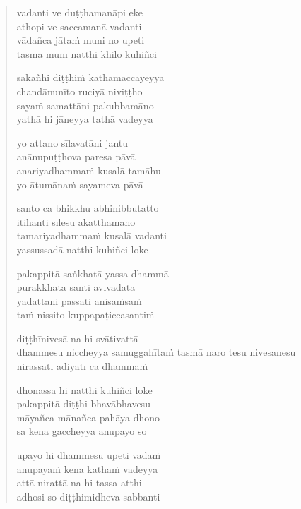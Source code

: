 

\cleartoverso

\vspace*{30mm}

\begin{verse}

vadanti ve duṭṭhamanāpi eke\\
athopi ve saccamanā vadanti\\
vādañca jātaṁ muni no upeti\\
tasmā munī natthi khilo kuhiñci

sakañhi diṭṭhiṁ kathamaccayeyya\\
chandānunīto ruciyā niviṭṭho\\
sayaṁ samattāni pakubbamāno\\
yathā hi jāneyya tathā vadeyya

yo attano sīlavatāni jantu\\
anānupuṭṭhova paresa pāvā\\
anariyadhammaṁ kusalā tamāhu\\
yo ātumānaṁ sayameva pāvā

santo ca bhikkhu abhinibbutatto\\
itihanti sīlesu akatthamāno\\
tamariyadhammaṁ kusalā vadanti\\
yassussadā natthi kuhiñci loke

pakappitā saṅkhatā yassa dhammā\\
purakkhatā santi avīvadātā\\
yadattani passati ānisaṁsaṁ\\
taṁ nissito kuppapaṭiccasantiṁ

diṭṭhīnivesā na hi svātivattā\\
dhammesu niccheyya samuggahītaṁ
tasmā naro tesu nivesanesu\\
nirassatī ādiyatī ca dhammaṁ

dhonassa hi natthi kuhiñci loke\\
pakappitā diṭṭhi bhavābhavesu\\
māyañca mānañca pahāya dhono\\
sa kena gaccheyya anūpayo so

upayo hi dhammesu upeti vādaṁ\\
anūpayaṁ kena kathaṁ vadeyya\\
attā nirattā na hi tassa atthi\\
adhosi so diṭṭhimidheva sabbanti

\end{verse}


